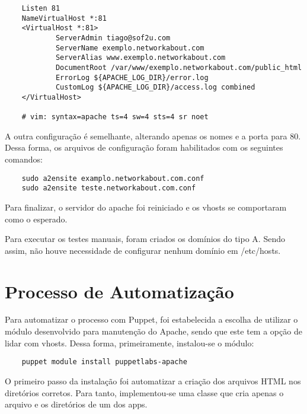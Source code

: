 \documentclass[12pt]{article}
\begin{document}
\begin{verbatim}
    Listen 81
    NameVirtualHost *:81	
    <VirtualHost *:81>
            ServerAdmin tiago@sof2u.com
            ServerName exemplo.networkabout.com
            ServerAlias www.exemplo.networkabout.com
            DocumentRoot /var/www/exemplo.networkabout.com/public_html
            ErrorLog ${APACHE_LOG_DIR}/error.log
            CustomLog ${APACHE_LOG_DIR}/access.log combined
    </VirtualHost>

    # vim: syntax=apache ts=4 sw=4 sts=4 sr noet
\end{verbatim}

A outra configuração é semelhante, alterando apenas os nomes e a porta para 80. Dessa forma, os arquivos de configuração
foram habilitados com os seguintes comandos:

\begin{verbatim}
    sudo a2ensite examplo.networkabout.com.conf
    sudo a2ensite teste.networkabout.com.conf
\end{verbatim}

Para finalizar, o servidor do apache foi reiniciado e os vhosts se comportaram como o esperado.

Para executar os testes manuais, foram criados os domínios do tipo A. Sendo assim, não houve necessidade de configurar nenhum domínio
em /etc/hosts.

\section{Processo de Automatização}
\label{sec:processo_de_automatiza_o}
Para automatizar o processo com Puppet, foi estabelecida a escolha de utilizar o módulo desenvolvido para
manutenção do Apache, sendo que este tem a opção de lidar com vhosts. Dessa forma, primeiramente, instalou-se o módulo:

\begin{verbatim}
    puppet module install puppetlabs-apache
\end{verbatim}

O primeiro passo da instalação foi automatizar a criação dos arquivos HTML nos diretórios corretos. Para tanto,
implementou-se uma classe que cria apenas o arquivo e os diretórios de um dos apps.
\end{document}

